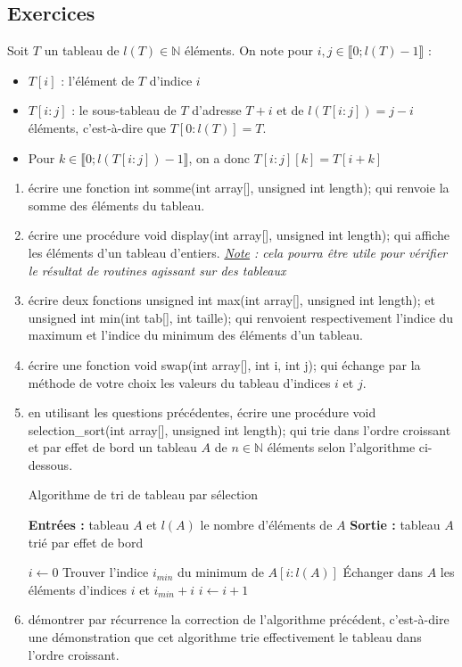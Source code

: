 \documentclass[../../../main.tex]{subfiles}
\begin{document}
\subsection{Exercices}
Soit $T$ un tableau de $l(T)\in\mathbb{N}$ éléments. On note pour $i, j\in{\llbracket 0; l(T)-1}\rrbracket$ :
\begin{itemize}
	\item $T[i]$ : l'élément de $T$ d'indice $i$
	\item $T[i:j]$ : le sous-tableau de $T$ d'adresse $T + i$ et de $l(T[i:j]) = j - i$ éléments, c'est-à-dire que $T[0:l(T)] = T$.
	\item Pour $k\in\llbracket 0; l(T[i:j]) - 1 \rrbracket$, on a donc $T[i:j][k] = T[i + k]$
\end{itemize}
\begin{enumerate}
	\item écrire une fonction \textsf{int somme(int array[], unsigned int length);} qui renvoie la somme des éléments du tableau.
	\item écrire une procédure \textsf{void display(int array[], unsigned int length);} qui affiche les éléments d'un tableau d'entiers.\newline
		\textit{\underline{Note} : cela pourra être utile pour vérifier le résultat de routines agissant sur des tableaux}
 	\item écrire deux fonctions \textsf{unsigned int max(int array[], unsigned int length);} et \textsf{unsigned int min(int tab[], int taille);} qui renvoient respectivement l'indice du maximum et l'indice du minimum des éléments d'un tableau.
	\item écrire une fonction \textsf{void swap(int array[], int i, int j);} qui échange par la méthode de votre choix les valeurs du tableau d'indices $i$ et $j$.
	\item en utilisant les questions précédentes, écrire une procédure \textsf{void selection\_sort(int array[], unsigned int length);} qui trie dans l'ordre croissant et par effet de bord un tableau $A$ de $n\in\mathbb{N}$ éléments selon l'algorithme ci-dessous.
\begin{algorithm}
\caption{Algorithme de tri de tableau par sélection}\label{alg:select_sort}
\textbf{Entrées :} tableau $A$ et $l(A)$ le nombre d'éléments de $A$\;
\textbf{Sortie :} tableau $A$ trié par effet de bord\;

$i\leftarrow 0$\;
 {
	Trouver l'indice $i_{min}$ du minimum de $A[i:l(A)]$\;
	Échanger dans $A$ les éléments d'indices $i$ et $i_{min} + i$\;
	$i\leftarrow i+1$\;
}
\end{algorithm}
\item démontrer par récurrence la correction de l'algorithme précédent, c'est-à-dire une démonstration que cet algorithme trie effectivement le tableau dans l'ordre croissant.
\end{enumerate}
\end{document}
